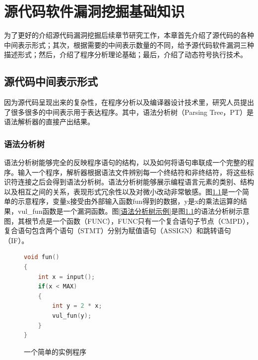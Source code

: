 \chapter{源代码软件漏洞挖掘基础知识}

为了更好的介绍源代码漏洞挖掘后续章节研究工作，本章首先介绍了源代码的各种中间表示形式；其次，根据需要的中间表示数量的不同，给予源代码软件漏洞三种描述形式；然后，介绍了程序分析理论基础；最后，介绍了动态符号执行技术。

%

\section{源代码中间表示形式}

因为源代码呈现出来的复杂性，在程序分析以及编译器设计技术里，研究人员提出了很多很多的中间表示用于表达程序。其中，语法分析树（Parsing Tree，PT）是语法解析器的直接产出结果。

\subsection{语法分析树}

语法分析树能够完全的反映程序语句的结构，以及如何将语句串联成一个完整的程序。输入一个程序，解析器根据语法文件辨别每一个终结符和非终结符，将这些标识符连接之后会得到语法分析树。语法分析树能够展示编程语言元素的类别、结构以及相互之间的关系，表现形式冗余性以及对微小改动非常敏感。图\ref{一个简单的实例程序}是一个简单的示意程序，变量x接受由外部输入函数fun得到的数据，y是x的乘法运算的结果，vul\_fun函数是一个漏洞函数。图\ref{语法分析树示例}是图\ref{一个简单的实例程序}的语法分析树示意图，其根节点是一个函数{（FUNC）}，FUNC只有一个复合语句子节点{（CMPD）}，复合语句包含两个语句{（STMT）}分别为赋值语句{（ASSIGN）}和跳转语句{（IF）}。


\begin{figure}[h]
\begin{lstlisting}[language=C]
void fun()
{
	int x = input();
	if(x < MAX)
	{
		int y = 2 * x;
		vul_fun(y);
	}
}
\end{lstlisting}
\caption{一个简单的实例程序}
\label{一个简单的实例程序}
\end{figure}


